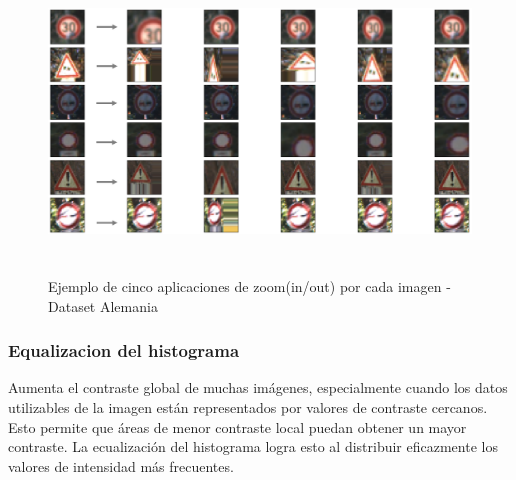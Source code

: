 			\begin{figure}[H]
				\begin{center}
				\includegraphics[width=1\textwidth,height=8cm]{images/desarrollo/Augment/zoom_inv}
				\end{center}
				\begin{center}
				\vspace{0.5em}
				\caption{\small{Ejemplo de cinco aplicaciones de zoom(in/out) por cada imagen - Dataset Alemania}}
				\vspace{-1em}
			{\small{\fontsize{10}{16.8}\selectfont {Fuente propia}}}
				\end{center}
				\vspace{-1.5em}
			\end{figure}


		\subsubsection{Equalizacion del histograma}
			Aumenta el contraste global de muchas imágenes, especialmente cuando los datos utilizables de la imagen están representados por valores de contraste cercanos. Esto permite que áreas de menor contraste local puedan obtener un mayor contraste. La ecualización del histograma logra esto al distribuir eficazmente los valores de intensidad más frecuentes.


